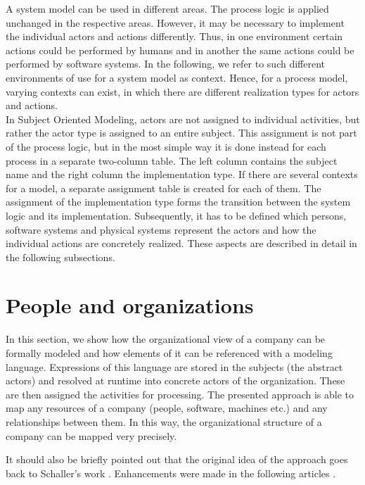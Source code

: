 A system model can be used in different areas. The process logic is applied unchanged in the respective areas. However, it may be necessary to implement the individual actors and actions differently. Thus, in one environment certain actions could be performed by humans and in another the same actions could be performed by software systems. In the following, we refer to such different environments of use for a system model as context. Hence, for a process model, varying contexts can exist, in which there are different realization types for actors and actions.\\ 
In Subject Oriented Modeling, actors are not assigned to individual activities, but rather the actor type is assigned to an entire subject. This assignment is not part of the process logic, but in the most simple way it is done instead for each process in a separate two-column table. The left column contains the subject name and the right column the implementation type. If there are several contexts for a model, a separate assignment table is created for each of them.
The assignment of the implementation type forms the transition between the system logic and its implementation. Subsequently, it has to be defined which persons, software systems and physical systems represent the actors and how the individual actions are concretely realized. These aspects are described in detail in the following subsections.

\section{People and organizations}

In this section, we show how the organizational view of a company can be formally modeled and how elements of it can be referenced with a modeling language.  Expressions of this language are stored in the subjects (the abstract actors) and resolved at runtime into concrete actors of the organization. These are then assigned the activities for processing. The presented approach is able to map any resources of a company (people, software, machines etc.) and any relationships between them. In this way, the organizational structure of a company can be mapped very precisely. 

It should also be briefly pointed out that the original idea of the approach goes back to Schaller's work  \cite{Schaller98}. Enhancements were made in the following articles \cite{Lawall2014, Lawall2014a, Lawall2014b, Lawall2014d, Lawall2014c, Lawall2013, Lawall2011}. 


